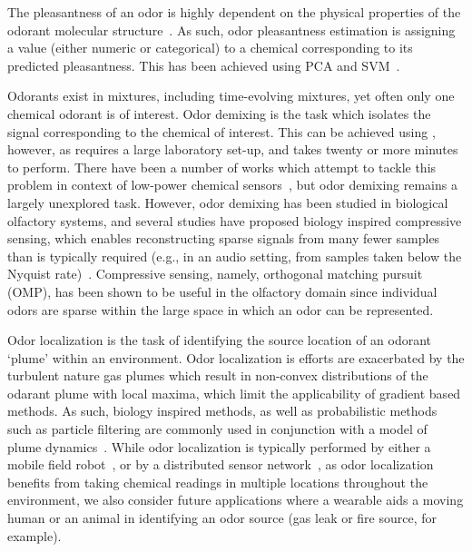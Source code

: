The pleasantness of an odor is highly dependent on the physical properties of
the odorant molecular structure~\cite{arshamian2022perception}. As such, odor
pleasantness estimation is assigning a value (either numeric or categorical) to
a chemical corresponding to its predicted pleasantness.  This has been achieved
using PCA and SVM~\cite{li2018accurate, li2020perception, shang2017machine}.

Odorants exist in mixtures, including time-evolving mixtures, yet often only
one chemical odorant is of interest.  Odor demixing is the task which isolates
the signal corresponding to the chemical of interest.  
This can be achieved
using \gcms{}, however, as \gcms{} requires a large laboratory set-up, and
takes twenty or more minutes to perform. %
There have been a number of works
which attempt to tackle this problem in context of low-power chemical sensors~\cite{maho2021real, victor2014combining,
fonollosa2014chemical}, but odor demixing remains a largely unexplored \olfc{}
task. However, odor demixing has been studied in biological olfactory systems,
and several studies have proposed biology inspired compressive sensing, which
enables reconstructing sparse signals from many fewer samples than is typically
required (e.g., in an audio setting, from samples taken below the Nyquist
rate)~\cite{fornasier2015compressive}. Compressive sensing, namely, orthogonal
matching pursuit (OMP), has been shown to be useful in the olfactory domain
since individual odors are sparse within the large space in which an odor can
be represented.

Odor localization is the task of identifying the source location of an
odorant `plume' within an environment.  Odor localization is efforts are
exacerbated by the turbulent nature gas plumes which result in non-convex
distributions of the odarant plume with local maxima, which limit the
applicability of gradient based methods.  As such, biology inspired methods, as
well as probabilistic methods such as particle filtering are commonly used in
conjunction with a model of plume dynamics~\cite{vickers2000mechanisms}.
While odor localization
is typically performed by either a mobile field robot~\cite{chen2019odor}, or
by a distributed sensor network~\cite{hayes2002distributed}, as odor
localization benefits from taking chemical readings in multiple locations
throughout the environment, we also consider future applications where a
wearable aids a moving human or an animal in identifying an odor source (gas
leak or fire source, for example).

